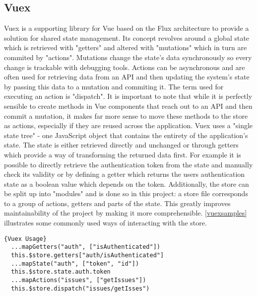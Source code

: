 \subsection{Vuex} \label{vuex}
Vuex is a supporting library for Vue based on the Flux architecture to provide a solution for shared state management. Its concept revolves around a global state which is retrieved with "getters" and altered with "mutations" which in turn are commited by "actions". Mutations change the state's data synchronously so every change is trackable with debugging tools. Actions can be asynchronous and are often used for retrieving data from an API and then updating the system's state by passing this data to a mutation and commiting it. The term used for executing an action is "dispatch". It is important to note that while it is perfectly sensible to create methods in Vue components that reach out to an API and then commit a mutation, it makes far more sense to move these methods to the store as actions, especially if they are reused across the application. Vuex uses a "single state tree" - one JavaScript object that contains the entirety of the application's state. The state is either retrieved directly and unchanged or through getters which provide a way of transforming the returned data first. For example it is possible to directly retrieve the authentication token from the state and manually check its validity or by defining a getter which returns the users authentication state as a boolean value which depends on the token. Additionally, the store can be split up into "modules" and is done so in this project: a store file corresponds to a group of actions, getters and parts of the state. This greatly improves maintainability of the project by making it more comprehensible. \autoref{vuexsamples} illustrates some commonly used ways of interacting with the store. \newline

\begin{lstlisting}[caption=Vuex Usage, captionpos=b, style=htmlcssjs, label=vuexsamples]{Vuex Usage}
  ...mapGetters("auth", ["isAuthenticated"])
  this.$store.getters["auth/isAuthenticated"]
  ...mapState("auth", ["token", "id"])
  this.$store.state.auth.token
  ...mapActions("issues", ["getIssues"])
  this.$store.dispatch("issues/getIsses")
\end{lstlisting}

